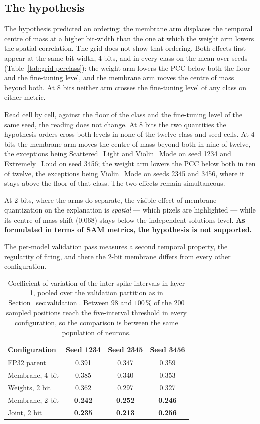 \subsection{The hypothesis}
\label{sec:hypothesis-result}

The hypothesis predicted an ordering: the membrane arm displaces the temporal
centre of mass at a higher bit-width than the one at which the weight arm lowers
the spatial correlation. The grid does not show that ordering. Both effects first
appear at the same bit-width, 4 bits, and in every class on the mean over seeds
(Table~\ref{tab:grid-perclass}): the weight arm lowers the PCC below both the
floor and the fine-tuning level, and the membrane arm moves the centre of mass
beyond both. At 8 bits neither arm crosses the fine-tuning level of any class on
either metric.

Read cell by cell, against the floor of the class and the fine-tuning level of
the same seed, the reading does not change. At 8 bits the two quantities the
hypothesis orders cross both levels in none of the twelve class-and-seed cells.
At 4 bits the membrane arm moves the centre of mass beyond both in nine of
twelve, the exceptions being Scattered\_Light and Violin\_Mode on seed 1234 and
Extremely\_Loud on seed 3456; the weight arm lowers the PCC below both in ten of
twelve, the exceptions being Violin\_Mode on seeds 2345 and 3456, where it stays
above the floor of that class. The two effects remain simultaneous.

At 2 bits, where the arms do separate, the visible effect of membrane
quantization on the explanation is \emph{spatial} --- which pixels are
highlighted --- while its centre-of-mass shift ($0.068$) stays below the
independent-solutions level. \textbf{As formulated in terms of SAM metrics, the
hypothesis is not supported.}

The per-model validation pass measures a second temporal property, the
regularity of firing, and there the 2-bit membrane differs from every other
configuration.

\begin{table}[htbp]
\centering
\begin{tabular}{lccc}
\toprule
Configuration & Seed 1234 & Seed 2345 & Seed 3456 \\
\midrule
FP32 parent     & 0.391 & 0.347 & 0.359 \\
Membrane, 4 bit & 0.385 & 0.340 & 0.353 \\
Weights, 2 bit  & 0.362 & 0.297 & 0.327 \\
Membrane, 2 bit & \textbf{0.242} & \textbf{0.252} & \textbf{0.246} \\
Joint, 2 bit    & \textbf{0.235} & \textbf{0.213} & \textbf{0.256} \\
\bottomrule
\end{tabular}
\caption{Coefficient of variation of the inter-spike intervals in layer 1,
pooled over the validation partition as in Section~\ref{sec:validation}. Between
$98$ and $100$\,\% of the 200 sampled positions reach the five-interval threshold
in every configuration, so the comparison is between the same population of
neurons.}
\label{tab:cv-isi-grid}
\end{table}

